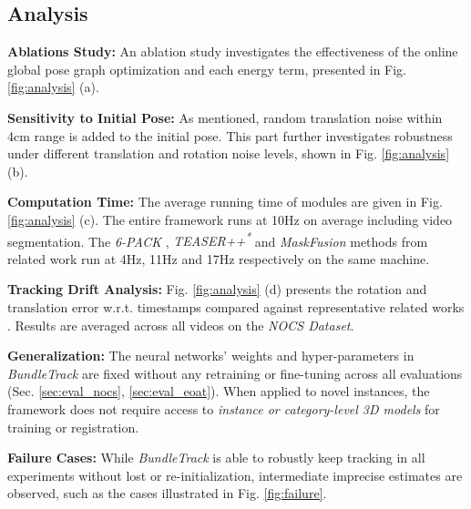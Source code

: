 \documentclass[letterpaper, 10 pt, conference]{ieeeconf}
\begin{document}
\subsection{Analysis}\label{sec:sys_analysis}
\vspace{-0.05in}
\noindent \textbf{Ablations Study:} An ablation study investigates the effectiveness of the online global pose graph optimization and each energy term, presented in Fig. \ref{fig:analysis} (a).

\noindent \textbf{Sensitivity to Initial Pose:} As mentioned, random translation noise within 4cm range is added to the initial pose. This part further investigates robustness under different translation and rotation noise levels, shown in Fig. \ref{fig:analysis} (b).


\noindent \textbf{Computation Time:} The average running time of modules are given in Fig. \ref{fig:analysis} (c). The entire framework runs at 10Hz on average including video segmentation. The \textit{6-PACK} \cite{wang20196-pack}, \textit{TEASER++\textsuperscript{*}} \cite{Yang20troteaser} and \textit{MaskFusion} \cite{runz2018maskfusion} methods from related work run at 4Hz, 11Hz and 17Hz respectively on the same machine.


\noindent \textbf{Tracking Drift Analysis:} Fig. \ref{fig:analysis} (d) presents the rotation and translation error w.r.t. timestamps compared against representative related works \cite{runz2018maskfusion,wang20196-pack,Yang20troteaser}. Results are averaged across all videos on the \textit{NOCS Dataset}. 


\noindent \textbf{Generalization:} The neural networks' weights and hyper-parameters in \textit{BundleTrack} are fixed without any retraining or fine-tuning across all evaluations (Sec. \ref{sec:eval_nocs}, \ref{sec:eval_eoat}). When applied to novel instances, the framework does not require access to \textit{instance or category-level 3D models} for training or registration.




\noindent \textbf{Failure Cases:}  While \textit{BundleTrack} is able to robustly keep tracking in all experiments without lost or re-initialization, intermediate imprecise estimates are observed, such as the cases illustrated in Fig. \ref{fig:failure}. 
\end{document}
